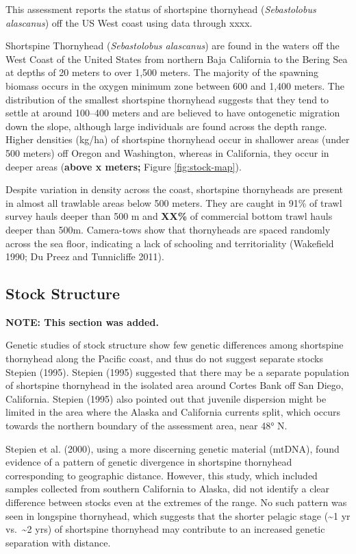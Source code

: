 \documentclass[11pt,
  english,
  letterpaper,
]{article}
\begin{document}
This assessment reports the status of shortspine thornyhead (\emph{Sebastolobus alascanus}) off the US West coast using data through xxxx.

Shortspine Thornyhead (\emph{Sebastolobus alascanus}) are found in the waters off the West Coast of the United States from northern Baja California to the Bering Sea at depths of 20 meters to over 1,500 meters. The majority of the spawning biomass occurs in the oxygen minimum zone between 600 and 1,400 meters. The distribution of the smallest shortspine thornyhead suggests that they tend to settle at around 100--400 meters and are believed to have ontogenetic migration down the slope, although large individuals are found across the depth range. Higher densities (kg/ha) of shortspine thornyhead occur in shallower areas (under 500 meters) off Oregon and Washington, whereas in California, they occur in deeper areas (\textbf{above x meters;} Figure \ref{fig:stock-map}).

Despite variation in density across the coast, shortspine thornyheads are present in almost all trawlable areas below 500 meters. They are caught in 91\% of trawl survey hauls deeper than 500 m and \textbf{XX\%} of commercial bottom trawl hauls deeper than 500m. Camera-tows show that thornyheads are spaced randomly across the sea floor, indicating a lack of schooling and territoriality (Wakefield 1990; Du Preez and Tunnicliffe 2011).

\hypertarget{stock-structure}{%
\subsection{Stock Structure}\label{stock-structure}}

\textbf{NOTE: This section was added.}

Genetic studies of stock structure show few genetic differences among shortspine thornyhead along the Pacific coast, and thus do not suggest separate stocks Stepien (1995). Stepien (1995) suggested that there may be a separate population of shortspine thornyhead in the isolated area around Cortes Bank off San Diego, California. Stepien (1995) also pointed out that juvenile dispersion might be limited in the area where the Alaska and California currents split, which occurs towards the northern boundary of the assessment area, near 48° N.

Stepien et al. (2000), using a more discerning genetic material (mtDNA), found evidence of a pattern of genetic divergence in shortspine thornyhead corresponding to geographic distance. However, this study, which included samples collected from southern California to Alaska, did not identify a clear difference between stocks even at the extremes of the range. No such pattern was seen in longspine thornyhead, which suggests that the shorter pelagic stage (\textasciitilde1 yr vs.~\textasciitilde2 yrs) of shortspine thornyhead may contribute to an increased genetic separation with distance.
\end{document}
